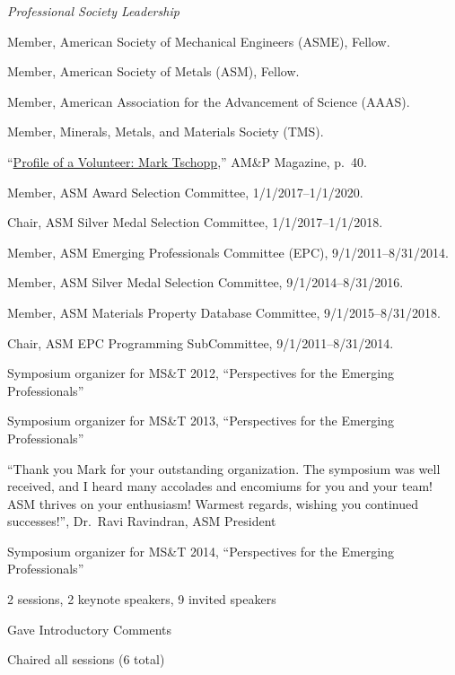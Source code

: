 \textit{Professional Society Leadership}
\begin{list2}
\item Member, American Society of Mechanical Engineers (ASME), Fellow.
\item Member, American Society of Metals (ASM), Fellow.
\item Member, American Association for the Advancement of Science (AAAS).
\item Member, Minerals, Metals, and Materials Society (TMS).
\item ``\href{http://mio.asminternational.org/amp/201801/40/}{Profile of a Volunteer: Mark Tschopp},'' AM\&P Magazine, p.~40.  

\item Member, ASM Award Selection Committee, 1/1/2017--1/1/2020.
\item Chair, ASM Silver Medal Selection Committee, 1/1/2017--1/1/2018.
\item Member, ASM Emerging Professionals Committee (EPC), 9/1/2011--8/31/2014.
\item Member, ASM Silver Medal Selection Committee, 9/1/2014--8/31/2016.
\item Member, ASM Materials Property Database Committee, 9/1/2015--8/31/2018.

\item Chair, ASM EPC Programming SubCommittee, 9/1/2011--8/31/2014.
\begin{list2}
\item	Symposium organizer for MS\&T 2012, ``Perspectives for the Emerging Professionals''
\item	Symposium organizer for MS\&T 2013, ``Perspectives for the Emerging Professionals''
\begin{list2}
\item ``Thank you Mark for your outstanding organization. The symposium was well received, and I heard many accolades and encomiums for you and your team! ASM thrives on your enthusiasm! Warmest regards, wishing you continued successes!'', Dr.~Ravi Ravindran, ASM President
\end{list2}
\item	Symposium organizer for MS\&T 2014, ``Perspectives for the Emerging Professionals''
\begin{list2}
\item  2 sessions, 2 keynote speakers, 9 invited speakers
\item  Gave Introductory Comments
\end{list2}
\item Chaired all sessions (6 total)
\end{list2}


\end{list2}
